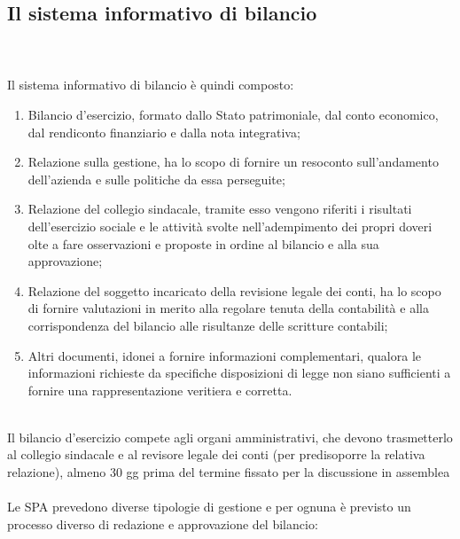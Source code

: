 \documentclass{report}
\begin{document}
\subsection{Il sistema informativo di bilancio} %
\label{sub:Il sistema informativo di bilancio}
\\
\\
Il sistema informativo di bilancio è quindi composto:
\\
\begin{enumerate}
  \item{Bilancio d'esercizio, formato dallo Stato patrimoniale, dal conto economico, dal rendiconto finanziario e dalla nota integrativa;}
  \item{Relazione sulla gestione, ha lo scopo di fornire un resoconto sull'andamento dell'azienda e sulle politiche da essa perseguite;}
  \item{Relazione del collegio sindacale, tramite esso vengono riferiti i risultati dell'esercizio sociale e le attività svolte nell'adempimento dei propri doveri olte a fare osservazioni e proposte in ordine al bilancio e alla sua approvazione;}
  \item{Relazione del soggetto incaricato della revisione legale dei conti, ha lo scopo di fornire valutazioni in merito alla regolare tenuta della contabilità e alla corrispondenza del bilancio alle risultanze delle scritture contabili;}
  \item{Altri documenti, idonei a fornire informazioni complementari, qualora le informazioni richieste da specifiche disposizioni di legge non siano sufficienti a fornire una rappresentazione veritiera e corretta.}
\end{enumerate}
\\
Il bilancio d'esercizio compete agli organi amministrativi, che devono trasmetterlo al collegio sindacale  e al revisore legale dei conti (per predisoporre la relativa relazione), almeno 30 gg prima del termine fissato per la discussione in assemblea
\\
\\
Le SPA prevedono diverse tipologie di gestione e per ognuna è previsto un processo diverso di redazione e approvazione del bilancio:
\\
\end{document}
